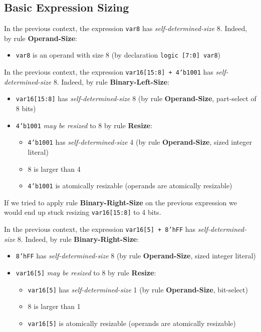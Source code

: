 \documentclass{article}
\newcommand{\sv}[1]{\texttt{#1}}
\newcommand{\sds}{\emph{self-determined-size}}
\newcommand{\mbr}{\emph{may be resized}}
\begin{document}
\subsection{Basic Expression Sizing}

In the previous context, the expression \sv{var8} has
\sds{} 8. Indeed, by rule \textbf{Operand-Size}:
\begin{itemize}
  \item \sv{var8} is an operand with size 8 (by declaration
    \sv{logic [7:0] var8})
\end{itemize}

In the previous context, the expression \sv{var16[15:8] + 4'b1001} has
\sds{} 8. Indeed, by rule \textbf{Binary-Left-Size}:

\begin{itemize}
  \item \sv{var16[15:8]} has \sds{} 8 (by rule
    \textbf{Operand-Size}, part-select of 8 bits)
  \item \sv{4'b1001} \mbr{} to 8 by rule \textbf{Resize}:
    \begin{itemize}
      \item \sv{4'b1001} has \sds{} 4 (by rule
        \textbf{Operand-Size}, sized integer literal)
      \item 8 is larger than 4
      \item \sv{4'b1001} is atomically resizable (operands are
        atomically resizable)
    \end{itemize}
\end{itemize}

If we tried to apply rule \textbf{Binary-Right-Size} on the previous expression
we would end up stuck resizing \sv{var16[15:8]} to 4 bits.

In the previous context, the expression \sv{var16[5] + 8'hFF} has
\sds{} 8. Indeed, by rule \textbf{Binary-Right-Size}:

\begin{itemize}
  \item \sv{8'hFF} has \sds{} 8 (by rule
    \textbf{Operand-Size}, sized integer literal)
  \item \sv{var16[5]} \mbr{} to 8 by rule \textbf{Resize}:
    \begin{itemize}
      \item \sv{var16[5]} has \sds{} 1 (by rule
        \textbf{Operand-Size}, bit-select)
      \item 8 is larger than 1
      \item \sv{var16[5]} is atomically resizable (operands are
        atomically resizable)
    \end{itemize}
\end{itemize}
\end{document}
